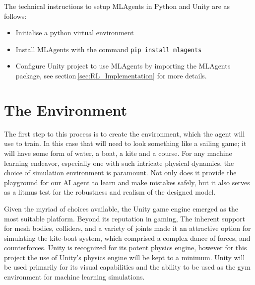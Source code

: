 





The technical instructions to setup MLAgents in Python and Unity are as follows:
\begin{itemize}
    \item Initialise a python virtual environment
    \item Install MLAgents with the command \texttt{pip install mlagents}
    \item Configure Unity project to use MLAgents by importing the MLAgents package, see section$~$\ref{sec:RL_Implementation} for more details.
\end{itemize}

\section{The Environment}

The first step to this process is to create the environment, which the agent will use to train. In this case that will need to look something like a sailing game; it will have some form of water, a boat, a kite and a course. 
For any machine learning endeavor, especially one with such intricate physical dynamics, the choice of simulation environment is paramount. Not only does it provide the playground for our AI agent to learn and make mistakes safely, but it also serves as a litmus test for the robustness and realism of the designed model.

Given the myriad of choices available, the Unity game engine emerged as the most suitable platform. Beyond its reputation in gaming, 
The inherent support for mesh bodies, colliders, and a variety of joints made it an attractive option for simulating the kite-boat system, which comprised a complex dance of forces, and counterforces.
Unity is recognized for its potent physics engine, however for this project the use of Unity's physics engine will be kept to a minimum. Unity will be used primarily for its visual capabilities and the ability to be used as the gym environment for machine learning simulations. 

